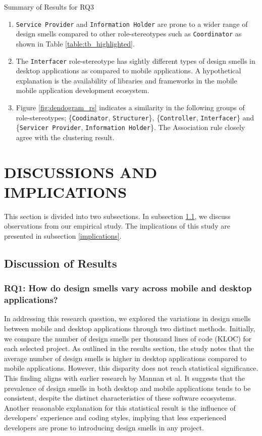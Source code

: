 \documentclass[AMA,Times1COL]{WileyNJDv5} %
\begin{document}
	\newpage
		\begin{boxwithhead}
		{Summary of Results for RQ3}
		{\noindent 
			\begin{enumerate}
				\item \texttt{Service Provider} and \texttt{Information Holder} are prone to a wider range of design smells compared to other role-stereotypes such as \texttt{Coordinator} as shown in Table \ref{table:tb_highlighted}. 
				\item The \texttt{Interfacer} role-stereotype has sightly different types of design smells in desktop applications as compared to mobile applications. A hypothetical explanation is the availability of libraries and frameworks in the mobile mobile application development ecosystem.
				\item Figure \ref{fig:dendogram_rs} indicates a similarity in the following groups of role-stereotypes; \{\texttt{Coodinator}, \texttt{Structurer}\}, 
				\{\texttt{Controller}, \texttt{Interfacer}\} and 
				\{\texttt{Servicer Provider}, \texttt{Information Holder}\}. The Association rule closely agree with the clustering result.
			\end{enumerate}
		}
	\end{boxwithhead}
	
	
	
	\section{DISCUSSIONS AND IMPLICATIONS}\label{sec:ds_imp}
	This section is divided into two subsections. In subsection \ref{discussion}, we discuss observations from our empirical study. The implications of this study are presented in subsection \ref{implications}.
	\subsection{Discussion of Results} \label{discussion}
	\subsubsection*{RQ1: How do design smells vary across mobile and desktop applications?}
	In addressing this research question, we explored the variations in design smells between mobile and desktop applications through two distinct methods. Initially, we compare the number of design smells per thousand lines of code (KLOC) for each selected project. As outlined in the results section, the study notes that the average number of design smells is higher in desktop applications compared to mobile applications. However, this disparity does not reach statistical significance. This finding aligns with earlier research by Mannan et al\cite{mannan2016understanding}. It suggests that the prevalence of design smells in both desktop and mobile applications tends to be consistent, despite the distinct characteristics of these software ecosystems. Another reasonable explanation for this statistical result is the influence of developers' experience and coding styles, implying that less experienced developers are prone to introducing design smells in any project.
	
\end{document}
